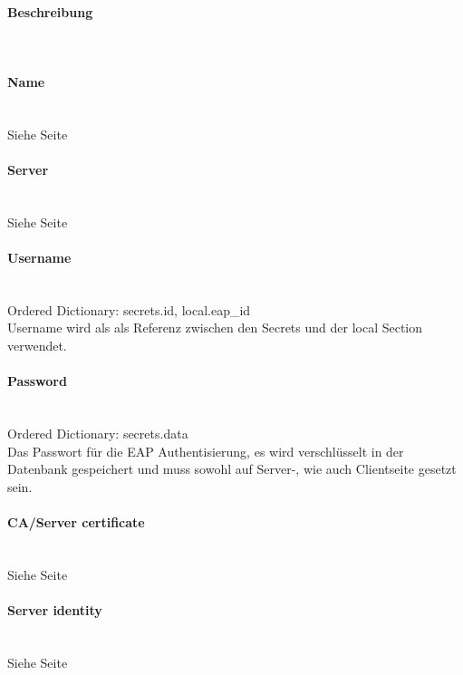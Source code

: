 \begin{minipage}[t]{0.5\textwidth}
\vspace{0pt}
\paragraph{Beschreibung}\mbox{}\\

\paragraph{Name}\mbox{}\\
Siehe Seite \pageref{name} \\

\paragraph{Server}\mbox{}\\
Siehe Seite \pageref{server} \\

\paragraph{Username}\label{username}\mbox{}\\
\hspace*{18pt}Ordered Dictionary: secrets.id, local.eap\_id\\
Username wird als als Referenz zwischen den Secrets und der local Section verwendet. \\

\paragraph{Password}\label{password}\mbox{}\\
\hspace*{18pt}Ordered Dictionary: secrets.data\\
Das Passwort für die EAP Authentisierung, es wird verschlüsselt in der Datenbank gespeichert und muss sowohl auf Server-, wie auch Clientseite gesetzt sein.\\

\paragraph{CA/Server certificate}\mbox{}\\
Siehe Seite \pageref{servercertificate} \\

\paragraph{Server identity}\mbox{}\\
Siehe Seite \pageref{serveridentitiy} \\

\end{minipage}
\newpage

